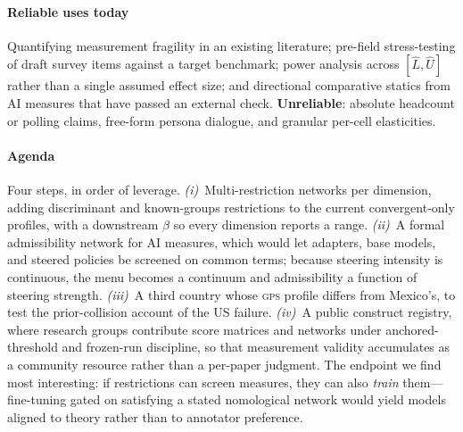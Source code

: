\documentclass[11pt,letterpaper]{article}
\newcommand{\GPS}{\textsc{gps}}
\begin{document}
\paragraph{Reliable uses today} Quantifying measurement fragility in an existing literature; pre-field
stress-testing of draft survey items against a target benchmark; power analysis across $[\widehat L, \widehat
U]$ rather than a single assumed effect size; and directional comparative statics from AI measures that have
passed an external check. \textbf{Unreliable}: absolute headcount or polling claims, free-form persona
dialogue, and granular per-cell elasticities.

\paragraph{Agenda} Four steps, in order of leverage. \emph{(i)}~Multi-restriction networks per dimension,
adding discriminant and known-groups restrictions to the current convergent-only profiles, with a downstream
$\beta$ so every dimension reports a range. \emph{(ii)}~A formal admissibility network for AI measures, which
would let adapters, base models, and steered policies \cite{turner2023,zou2023} be screened on common terms;
because steering intensity is continuous, the menu becomes a continuum and admissibility a function of
steering strength. \emph{(iii)}~A third country whose \GPS{} profile differs from Mexico's, to test the
prior-collision account of the US failure. \emph{(iv)}~A public construct registry, where research groups
contribute score matrices and networks under anchored-threshold and frozen-run discipline, so that
measurement validity accumulates as a community resource rather than a per-paper judgment. The endpoint we
find most interesting: if restrictions can screen measures, they can also \emph{train} them---fine-tuning
gated on satisfying a stated nomological network would yield models aligned to theory rather than to
annotator preference.
\end{document}
